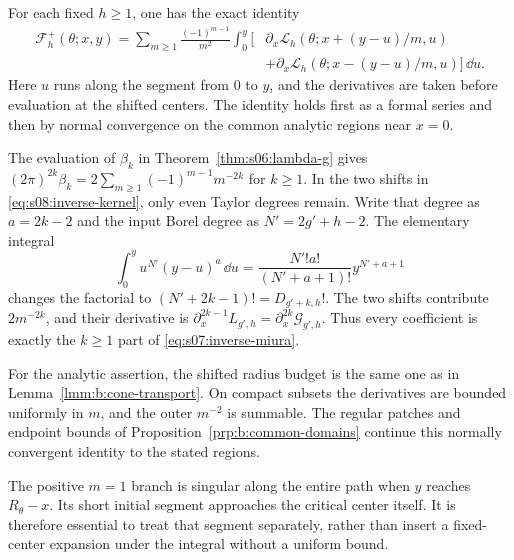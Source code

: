 \begin{lmm}\label{lmm:s08:inverse-kernel}
For each fixed $h\geq1$, one has the exact identity
\begin{equation}\label{eq:s08:inverse-kernel}
 \begin{aligned}
 \mathcal F_h^+(\theta;x,y)
 =\sum_{m\geq1}\frac{(-1)^{m-1}}{m^2}\int_0^y
 \bigl[&\partial_x\mathcal L_h(\theta;x+(y-u)/m,u)\\
       &+\partial_x\mathcal L_h(\theta;x-(y-u)/m,u)\bigr]\,\dd u.
 \end{aligned}
\end{equation}
Here $u$ runs along the segment from $0$ to $y$, and the derivatives
are taken before evaluation at the shifted centers. The identity
holds first as a formal series and then by normal convergence on
the common analytic regions near $x=0$.
\end{lmm}
\begin{prf}
The evaluation of $\beta_k$ in Theorem~\ref{thm:s06:lambda-g} gives
$(2\pi)^{2k}\beta_k
=2\sum_{m\geq1}(-1)^{m-1}m^{-2k}$ for $k\geq1$.
In the two shifts in \eqref{eq:s08:inverse-kernel}, only even Taylor
degrees remain. Write that degree as $a=2k-2$ and the input Borel
degree as $N'=2g'+h-2$. The elementary integral
\[
 \int_0^y u^{N'}(y-u)^a\,\dd u
       =\frac{N'!a!}{(N'+a+1)!}y^{N'+a+1}
\]
changes the factorial to $(N'+2k-1)!=D_{g'+k,h}!$.
The two shifts contribute $2m^{-2k}$, and their derivative is
$\partial_x^{2k-1}L_{g',h}=\partial_x^{2k}\mathcal G_{g',h}$.
Thus every coefficient is exactly the $k\geq1$ part of
\eqref{eq:s07:inverse-miura}.

For the analytic assertion, the shifted radius budget is the same
one as in Lemma~\ref{lmm:b:cone-transport}. On compact subsets the
derivatives are bounded uniformly in $m$, and the outer $m^{-2}$
is summable. The regular patches and endpoint bounds of
Proposition~\ref{prp:b:common-domains} continue this normally
convergent identity to the stated regions.
\end{prf}

The positive $m=1$ branch is singular along the entire path when
$y$ reaches $R_\theta-x$. Its short initial segment approaches the
critical center itself. It is therefore essential to treat that
segment separately, rather than insert a fixed-center expansion
under the integral without a uniform bound.

